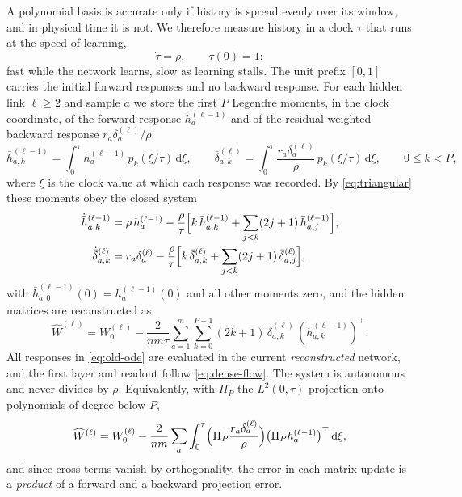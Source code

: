\documentclass[11pt]{article}
\theoremstyle{definition}
\theoremstyle{remark}
\newcommand{\dd}{\,\mathrm{d}}
\begin{document}
A polynomial basis is accurate only if history is spread evenly over its window,
and in physical time it is not.  We therefore measure history in a clock
$\tau$ that runs at the speed of learning,
\begin{equation}
 \dot\tau=\rho,\qquad \tau(0)=1:                        \label{eq:old-clock}
\end{equation}
fast while the network learns, slow as learning stalls.  The unit prefix
$[0,1]$ carries the initial forward responses and no backward response.  For
each hidden link $\ell\ge2$ and sample $a$ we store the first $P$ Legendre
moments, in the clock coordinate, of the forward response $h_a^{(\ell-1)}$ and
of the residual-weighted backward response $r_a\delta_a^{(\ell)}/\rho$:
\[
 \bar h^{(\ell-1)}_{a,k}=\int_0^{\tau} h_a^{(\ell-1)}\,p_k(\xi/\tau)\dd\xi,\qquad
 \bar\delta^{(\ell)}_{a,k}=\int_0^{\tau}\frac{r_a\delta_a^{(\ell)}}{\rho}\,
 p_k(\xi/\tau)\dd\xi,\qquad 0\le k<P,
\]
where $\xi$ is the clock value at which each response was recorded.  By
\eqref{eq:triangular} these moments obey the closed system
\begin{align}
 \dot{\bar h}^{(\ell-1)}_{a,k}&=\rho\,h_a^{(\ell-1)}-\frac{\rho}{\tau}
 \Bigl[k\,\bar h^{(\ell-1)}_{a,k}+\sum_{j<k}(2j+1)\,\bar h^{(\ell-1)}_{a,j}\Bigr],\nonumber\\
 \dot{\bar\delta}^{(\ell)}_{a,k}&=r_a\delta_a^{(\ell)}-\frac{\rho}{\tau}
 \Bigl[k\,\bar\delta^{(\ell)}_{a,k}+\sum_{j<k}(2j+1)\,\bar\delta^{(\ell)}_{a,j}\Bigr],
 \label{eq:old-ode}
\end{align}
with $\bar h^{(\ell-1)}_{a,0}(0)=h_a^{(\ell-1)}(0)$ and all other moments zero, and
the hidden matrices are reconstructed as
\begin{equation}
 \widehat W^{(\ell)}=W_0^{(\ell)}-\frac{2}{nm\tau}
 \sum_{a=1}^m\sum_{k=0}^{P-1}(2k+1)\,
 \bar\delta^{(\ell)}_{a,k}\,(\bar h^{(\ell-1)}_{a,k})^\top .   \label{eq:old-recon}
\end{equation}
All responses in \eqref{eq:old-ode} are evaluated in the current
\emph{reconstructed} network, and the first layer and readout follow
\eqref{eq:dense-flow}.  The system is autonomous and never divides by $\rho$.
Equivalently, with $\Pi_P$ the $L^2(0,\tau)$ projection onto polynomials of
degree below $P$,
\begin{equation}
 \widehat W^{(\ell)}=W_0^{(\ell)}-\frac{2}{nm}\sum_a
 \int_0^\tau\Bigl(\Pi_P\frac{r_a\delta_a^{(\ell)}}{\rho}\Bigr)
 \bigl(\Pi_Ph_a^{(\ell-1)}\bigr)^\top\dd\xi,               \label{eq:projection-form}
\end{equation}
and since cross terms vanish by orthogonality, the error in each matrix update is
a \emph{product} of a forward and a backward projection error.
\end{document}
